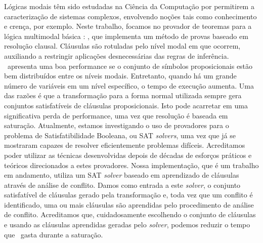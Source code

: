 Lógicas modais têm sido estudadas na Ciência da Computação por permitirem a
caracterização de sistemas complexos, envolvendo noções tais como
conhecimento e crença, por exemplo. Neste trabalho, focamos no provador de
teoremas para a lógica multimodal básica : \ksp, que implementa
um método de provas baseado em resolução clausal. Cláusulas são rotuladas pelo nível modal
em que ocorrem, auxiliando a restringir aplicações desnecessárias das regras de
inferência.
\ksp\ apresenta uma boa performance se o conjunto de símbolos proposicionais
estão bem distribuídos entre os níveis modais. Entretanto, quando há um grande
número de variáveis em um nível específico, o tempo de execução aumenta. Uma das
razões é que a transformação para a forma normal utilizada sempre gera conjuntos
satisfatíveis de cláusulas proposicionais. Isto pode acarretar em uma
significativa perda de performance, uma vez que resolução é baseada em
saturação. Atualmente, estamos investigando o uso de provadores para o problema
de Satisfatibilidade Booleana, ou SAT \emph{solvers}, uma vez que já se
mostraram capazes de resolver eficientemente problemas difíceis. Acreditamos
poder utilizar as técnicas desenvolvidas depois de décadas de esforços práticos
e teóricos direcionados a estes provadores.
Nossa implementação, que é um trabalho em andamento, utiliza um SAT
\emph{solver} baseado em aprendizado de cláusulas através de análise de conflito.
Damos como entrada a este \emph{solver}, o conjunto satisfatível de cláusulas gerado
pela transformação e, toda vez que um conflito é identificado, uma ou mais
cláusulas são aprendidas pelo procedimento de análise de conflito. Acreditamos
que, cuidadosamente escolhendo o conjunto de cláusulas e usando as cláusulas
aprendidas geradas pelo \emph{solver}, podemos reduzir o tempo que \ksp\ gasta
durante a saturação.
